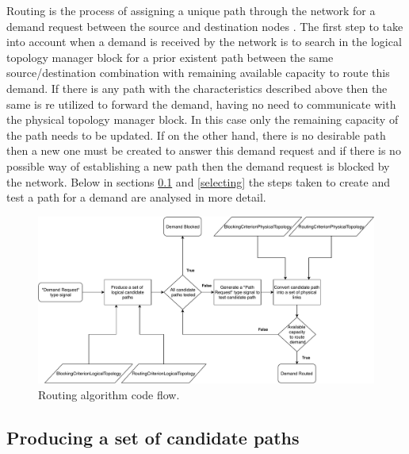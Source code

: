 Routing is the process of assigning a unique path through the network for a demand request between the source and destination nodes \cite{SimmonsJane2008}. %
The first step to take into account when a demand is received by the network is to search in the logical topology manager block for a prior existent path between the same source/destination combination with remaining available capacity to route this demand. If there is any path with the characteristics described above then the same is re utilized to forward the demand, having no need to communicate with the physical topology manager block. In this case only the remaining capacity of the path needs to be updated. If on the other hand, there is no desirable path then a new one must be created to answer this demand request and if there is no possible way of establishing a new path then the demand request is blocked by the network. Below in sections \ref{candidate} and \ref{selecting} the steps taken to create and test a path for a demand are analysed in more detail.
\vspace{11pt}
\begin{figure}[H]
  \begin{center}
    \includegraphics[width=1 \textwidth]{fig/logos/routing.pdf}
    \caption{Routing algorithm code flow.}
  \end{center}
  \label{routingAlgorithm}
\end{figure}

\subsection{Producing a set of candidate paths}
\label{candidate}

